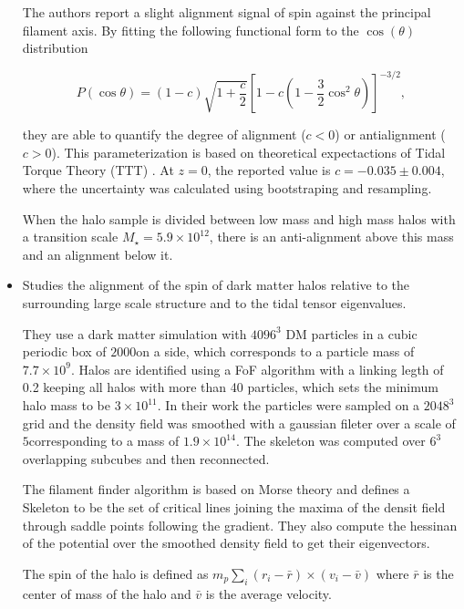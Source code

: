 \documentclass[usenatbib]{mn2e}
\newcommand{\hMpc}{{\ifmmode{h^{-1}{\rm Mpc}}\else{$h^{-1}$Mpc }\fi}}
\newcommand{\Msun}{{\ifmmode{{\rm {M_{\odot}}}}\else{${\rm{M_{\odot}}}$}\fi}}
\begin{document}
\begin{itemize}
The authors report a slight alignment signal of spin against the
principal filament axis. By fitting the following functional form to
the $\cos(\theta)$ distribution

\begin{equation}
P(\cos\theta) =
(1-c)\sqrt{1+\frac{c}{2}}\left[1-c\left(1-\frac{3}{2}\cos^{2}\theta
  \right)\right]^{-3/2}, 
\label{eq:distro}
\end{equation}

they are able to quantify the degree of alignment ($c<0$) or
antialignment ($c>0$).  This parameterization is based on theoretical
expectactions of Tidal Torque Theory (TTT) \citep{Lee2005}. At $z=0$,
the reported value is $c = −0.035 \pm 0.004$, where the uncertainty
was calculated using bootstraping and resampling. 

When the halo sample is divided between low mass and high mass halos
with a transition scale $M_{\star}=5.9\times 10^{12}$\Msun, there is
an anti-alignment above this mass and an alignment below it. 


\item 
\citep{Codis2012}
Studies the alignment of the spin of dark matter halos relative to
the surrounding large scale structure and to the tidal tensor
eigenvalues.

They use a dark matter simulation with $4096^3$ DM particles in a
cubic periodic box of $2000$\hMpc on a side, which corresponds to a
particle mass of $7.7\times 10^9$\Msun. Halos are identified
using a FoF algorithm with a linking legth of 0.2 keeping all halos
with more than 40 particles, which sets the minimum halo mass to be
$3\times 10^{11}$\Msun. In their work the particles were sampled on a
$2048^3$ grid and the density field was smoothed with a gaussian
fileter over a scale of $5$\hMpc corresponding to a mass of $1.9\times
10^{14}$. The skeleton was computed over $6^{3}$ overlapping subcubes
and then reconnected.



The filament finder algorithm is based on Morse theory and defines a
Skeleton to be the set of critical lines joining the maxima of the
densit field through saddle points following the gradient. They also
compute the hessinan of the potential over the smoothed density field
to get their eigenvectors.


The spin of the halo is defined as $m_{p}\sum_{i}(r_i-\bar{r})\times
(v_i-\bar{v})$ where $\bar{r}$ is the center of mass of the halo and
$\bar{v}$ is the average velocity.


\end{itemize}
\end{document}
